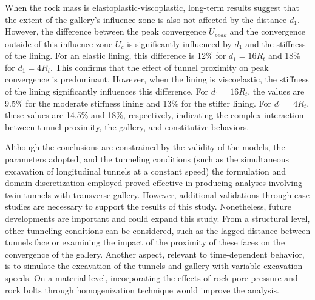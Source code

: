 \documentclass[a4paper,fleqn]{cas-sc}
\begin{document}
When the rock mass is elastoplastic-viscoplastic, long-term results suggest that the extent of the gallery's influence zone is also not affected by the distance $d_1$. However, the difference between the peak convergence $U_{peak}$ and the convergence outside of this influence zone $U_c$ is significantly influenced by $d_1$ and the stiffness of the lining. For an elastic lining, this difference is 12\% for $d_1 = 16R_t$ and 18\% for $d_1 = 4R_t$. This confirms that the effect of tunnel proximity on peak convergence is predominant. However, when the lining is viscoelastic, the stiffness of the lining significantly influences this difference. For $d_1 = 16R_t$, the values are 9.5\% for the moderate stiffness lining and 13\% for the stiffer lining. For $d_1 = 4R_t$, these values are 14.5\% and 18\%, respectively, indicating the complex interaction between tunnel proximity, the gallery, and constitutive behaviors.

Although the conclusions are constrained by the validity of the models, the parameters adopted, and the tunneling conditions (such as the simultaneous excavation of longitudinal tunnels at a constant speed) the formulation and domain discretization employed proved effective in producing analyses involving twin tunnels with transverse gallery. However, additional validations through case studies are necessary to support the results of this study. Nonetheless, future developments are important and could expand this study. From a structural level, other tunneling conditions can be considered, such as the lagged distance between tunnels face or examining the impact of the proximity of these faces on the convergence of the gallery. Another aspect, relevant to time-dependent behavior, is to simulate the excavation of the tunnels and gallery with variable excavation speeds. On a material level, incorporating the effects of rock pore pressure and rock bolts through homogenization technique would improve the analysis.




\end{document}
